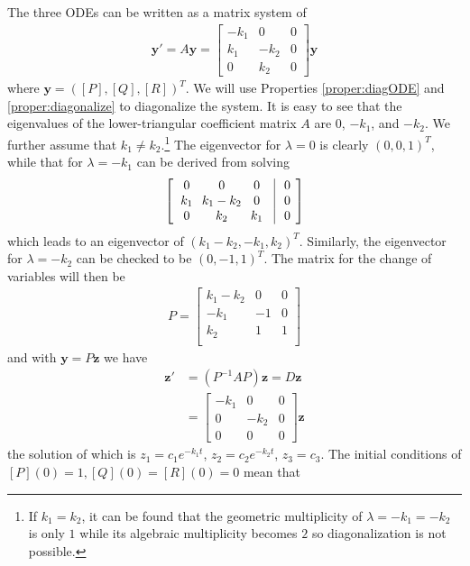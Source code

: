 \begin{solution}
The three ODEs can be written as a matrix system of
\begin{align*}
\textbf{y}'
= A\textbf{y} =
\begin{bmatrix}
-k_1 & 0 & 0 \\
k_1 & -k_2 & 0 \\
0 & k_2 & 0 
\end{bmatrix}
\textbf{y}
\end{align*}
where $\textbf{y} = ([P], [Q], [R])^T$. We will use Properties \ref{proper:diagODE} and \ref{proper:diagonalize} to diagonalize the system. It is easy to see that the eigenvalues of the lower-triangular coefficient matrix $A$ are $0$, $-k_1$, and $-k_2$. We further assume that $k_1 \neq k_2$.\footnote{If $k_1 = k_2$, it can be found that the geometric multiplicity of $\lambda = -k_1 = -k_2$ is only $1$ while its algebraic multiplicity becomes $2$ so diagonalization is not possible.} The eigenvector for $\lambda = 0$ is clearly $(0,0,1)^T$, while that for $\lambda = -k_1$ can be derived from solving
\begin{align*}
\left[\begin{array}{@{\,}wc{18pt}wc{18pt}wc{18pt}|wc{10pt}@{\,}}
0 & 0 & 0 & 0 \\
k_1 & k_1-k_2 & 0 & 0 \\
0 & k_2 & k_1 & 0
\end{array}\right]    
\end{align*}
which leads to an eigenvector of $(k_1-k_2,-k_1,k_2)^T$. Similarly, the eigenvector for $\lambda = -k_2$ can be checked to be $(0,-1,1)^T$. The matrix for the change of variables will then be
\begin{align*}
P = 
\begin{bmatrix}
k_1-k_2 & 0 & 0\\
-k_1 & -1 & 0\\
k_2 & 1 & 1\\
\end{bmatrix}
\end{align*}
and with $\textbf{y} = P\textbf{z}$ we have
\begin{align*}
\textbf{z}' &= (P^{-1}AP)\textbf{z} = D\textbf{z}\\
&= 
\begin{bmatrix}
-k_1 & 0 & 0 \\
0 & -k_2 & 0 \\
0 & 0 & 0
\end{bmatrix}\textbf{z}
\end{align*}
the solution of which is $z_1 = c_1e^{-k_1t}$, $z_2 = c_2e^{-k_2t}$, $z_3 = c_3$. The initial conditions of $[P](0) = 1, [Q](0) = [R](0) = 0$ mean that

\end{solution}

